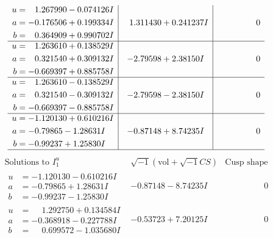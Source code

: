 \documentclass[1p]{elsarticle_modified}
\theoremstyle{definition}
\newcommand{\I}{\sqrt{-1}}
\begin{document}
$$\begin{array}{c|c|c}
\begin{aligned}
u &= \phantom{-}1.267990 - 0.074126 I \\
a &= -0.176506 + 0.199334 I \\
b &= \phantom{-}0.364909 + 0.990702 I\end{aligned}
 & \phantom{-}1.311430 + 0.241237 I & \phantom{-0.000000 } 0 \\ \hline\begin{aligned}
u &= \phantom{-}1.263610 + 0.138529 I \\
a &= \phantom{-}0.321540 + 0.309132 I \\
b &= -0.669397 + 0.885758 I\end{aligned}
 & -2.79598 + 2.38150 I & \phantom{-0.000000 } 0 \\ \hline\begin{aligned}
u &= \phantom{-}1.263610 - 0.138529 I \\
a &= \phantom{-}0.321540 - 0.309132 I \\
b &= -0.669397 - 0.885758 I\end{aligned}
 & -2.79598 - 2.38150 I & \phantom{-0.000000 } 0 \\ \hline\begin{aligned}
u &= -1.120130 + 0.610216 I \\
a &= -0.79865 - 1.28631 I \\
b &= -0.99237 + 1.25830 I\end{aligned}
 & -0.87148 + 8.74235 I & \phantom{-0.000000 } 0\\
 \hline 
 \end{array}$$\newpage$$\begin{array}{c|c|c}  
\text{Solutions to }I^u_{1}& \I (\text{vol} + \sqrt{-1}CS) & \text{Cusp shape}\\
 \hline 
\begin{aligned}
u &= -1.120130 - 0.610216 I \\
a &= -0.79865 + 1.28631 I \\
b &= -0.99237 - 1.25830 I\end{aligned}
 & -0.87148 - 8.74235 I & \phantom{-0.000000 } 0 \\ \hline\begin{aligned}
u &= \phantom{-}1.292750 + 0.134584 I \\
a &= -0.368918 - 0.227788 I \\
b &= \phantom{-}0.699572 - 1.035680 I\end{aligned}
 & -0.53723 + 7.20125 I & \phantom{-0.000000 } 0 \\ \hline\begin{aligned}

\end{aligned}
\end{array}$$
\end{document}
